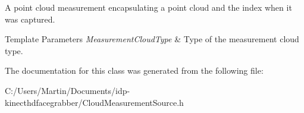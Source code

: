 A point cloud measurement encapsulating a point cloud and the index when it was captured. 


\begin{DoxyTemplParams}{Template Parameters}
{\em Measurement\+Cloud\+Type} & Type of the measurement cloud type. \\
\hline
\end{DoxyTemplParams}


The documentation for this class was generated from the following file\+:\begin{DoxyCompactItemize}
\item 
C\+:/\+Users/\+Martin/\+Documents/idp-\/kinecthdfacegrabber/Cloud\+Measurement\+Source.\+h\end{DoxyCompactItemize}
